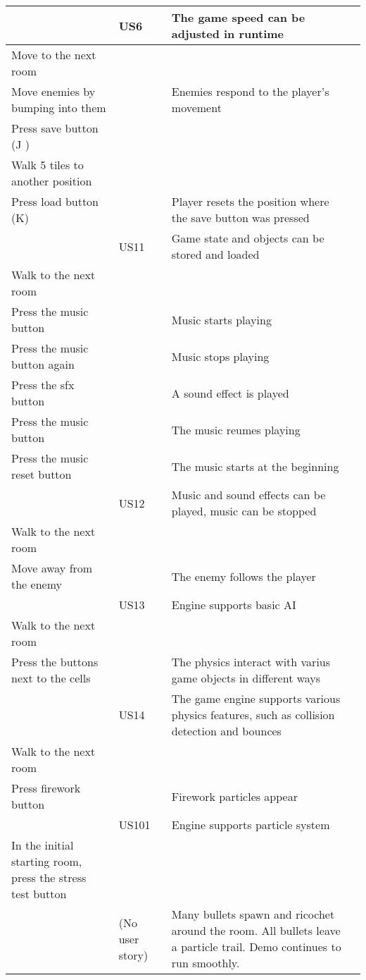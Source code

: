 \documentclass{article}
\begin{document}
\begin{longtable}{|p{3cm}|p{3cm}|p{6cm}|p{3cm}|}
& US6 & The game speed can be adjusted in runtime & \\ \hline
Move to the next room & & & \\ \hline
Move enemies by bumping into them & & Enemies respond to the player's movement & \\ \hline
Press save button  (J )& & & \\ \hline
Walk 5 tiles to another position & &  & \\ \hline
Press load button (K) & & Player resets the position where the save button was pressed & \\ \hline
& US11 & Game state and objects can be stored and loaded & \\ \hline
Walk to the next room & & & \\ \hline
Press the music button & & Music starts playing & \\ \hline
Press the music button again & & Music stops playing & \\ \hline
Press the sfx button & & A sound effect is played & \\ \hline
Press the music button & & The music reumes playing & \\ \hline
Press the music reset button & & The music starts at the beginning & \\ \hline
& US12 & Music and sound effects can be played, music can be stopped & \\ \hline
Walk to the next room & & & \\ \hline
Move away from the enemy & & The enemy follows the player & \\ \hline
& US13 & Engine supports basic AI & \\ \hline
Walk to the next room & & & \\ \hline
Press the buttons next to the cells & & The physics interact with varius game objects in different ways & \\ \hline
& US14 & The game engine supports various physics features, such as collision detection and bounces & \\ \hline
Walk to the next room & & & \\ \hline
Press firework button & & Firework particles appear & \\ \hline
& US101 & Engine supports particle system & \\ \hline
In the initial starting room, press the stress test button & & & \\ \hline
& (No user story) & Many bullets spawn and ricochet around the room. All bullets leave a particle trail. Demo continues to run smoothly. & \\ \hline

\end{longtable}
\end{document}
